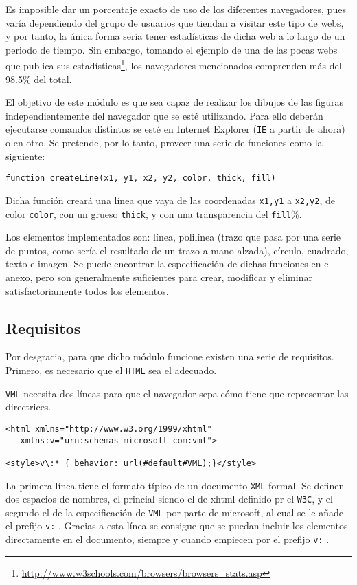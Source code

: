 Es imposible dar un porcentaje exacto de uso de los diferentes navegadores, pues varía dependiendo del grupo de usuarios que tiendan a visitar este tipo de webs, y por tanto, la única forma sería tener estadísticas de dicha web a lo largo de un periodo de tiempo. Sin embargo, tomando el ejemplo de una de las pocas webs que publica sus estadísticas\footnote{\url{http://www.w3schools.com/browsers/browsers_stats.asp}}, los navegadores mencionados comprenden más del 98.5\% del total.

El objetivo de este módulo es que sea capaz de realizar los dibujos de las figuras independientemente del navegador que se esté utilizando. Para ello deberán ejecutarse comandos distintos se esté en Internet Explorer (\texttt{IE} a partir de ahora) o en otro. Se pretende, por lo tanto, proveer una serie de funciones como la siguiente:

\begin{verbatim}
function createLine(x1, y1, x2, y2, color, thick, fill)
\end{verbatim}

Dicha función creará una línea que vaya de las coordenadas \texttt{x1,y1} a \texttt{x2,y2}, de color \texttt{color}, con un grueso \texttt{thick}, y con una transparencia del \texttt{fill}\%.

Los elementos implementados son: línea, polilínea (trazo que pasa por una serie de puntos, como sería el resultado de un trazo a mano alzada), círculo, cuadrado, texto e imagen. Se puede encontrar la especificación de dichas funciones en el anexo, pero son generalmente suficientes para crear, modificar y eliminar satisfactoriamente todos los elementos.

\subsection{Requisitos}
Por desgracia, para que dicho módulo funcione existen una serie de requisitos. Primero, es necesario que el \texttt{HTML} sea el adecuado.

\texttt{VML} necesita dos líneas para que el navegador sepa cómo tiene que representar las directrices.
\begin{verbatim}
<html xmlns="http://www.w3.org/1999/xhtml" 
   xmlns:v="urn:schemas-microsoft-com:vml">

<style>v\:* { behavior: url(#default#VML);}</style>
\end{verbatim}

La primera línea tiene el formato típico de un documento \texttt{XML} formal. Se definen dos espacios de nombres, el princial siendo el de xhtml definido pr el \texttt{W3C}, y el segundo el de la especificación de \texttt{VML} por parte de microsoft, al cual se le añade el prefijo \texttt{v:} . Gracias a esta línea se consigue que se puedan incluir los elementos directamente en el documento, siempre y cuando empiecen por el prefijo \texttt{v:} .

